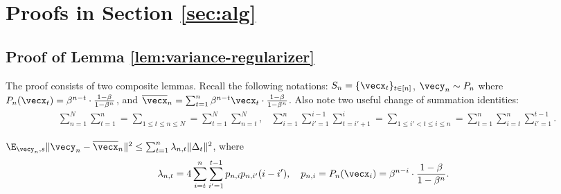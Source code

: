 \section{Proofs in Section \ref{sec:alg}}

\subsection{Proof of Lemma \ref{lem:variance-regularizer}}

The proof consists of two composite lemmas.
Recall the following notations: $S_n = \{\vecx_t\}_{t\in[n]}$, $\vecy_n\sim P_n$ where $P_n(\vecx_t) = \beta^{n-t}\cdot \frac{1-\beta}{1-\beta^n}$, and $\overline \vecx_n = \sum_{t=1}^n \beta^{n-t}\vecx_t\cdot \frac{1-\beta}{1-\beta^n}$. Also note two useful change of summation identities:
\begin{align*}
    &\sum_{n=1}^N\sum_{t=1}^n = \sum_{1\le t\le n\le N} = \sum_{t=1}^N\sum_{n=t}^N, 
    &\sum_{i=1}^n\sum_{i'=1}^{i-1}\sum_{t=i'+1}^i = \sum_{1\le i'<t\le i\le n} = \sum_{t=1}^n\sum_{i=t}^n\sum_{i'=1}^{t-1}.
\end{align*}

\begin{proposition}
\label{prop:variance-regularizer}
$\E_{\vecy_n,s}\|\vecy_n-\overline\vecx_n\|^2 \le \sum_{t=1}^n \lambda_{n,t}\|\Delta_t\|^2$, where
\begin{align}
    \lambda_{n,t} = 4\sum_{i=t}^n\sum_{i'=1}^{t-1} p_{n,i}p_{n,i'}(i-i'), 
    \quad p_{n,i} = P_n(\vecx_i) = \beta^{n-i}\cdot\frac{1-\beta}{1-\beta^n}. 
    \label{eq:def-lambda}
\end{align}
\end{proposition}

